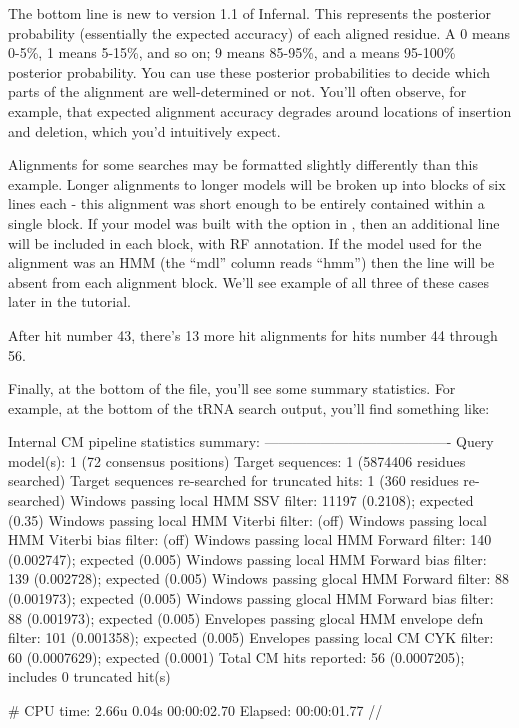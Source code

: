 The bottom line is new to version 1.1 of Infernal. This represents the
posterior probability (essentially the expected accuracy) of each
aligned residue. A 0 means 0-5\%, 1 means 5-15\%, and so on; 9 means
85-95\%, and a \otext{*} means 95-100\% posterior probability. You can
use these posterior probabilities to decide which parts of the
alignment are well-determined or not. You'll often observe, for
example, that expected alignment accuracy degrades around locations of
insertion and deletion, which you'd intuitively expect.

Alignments for some searches may be formatted slightly differently
than this example. Longer alignments to longer models will be broken
up into blocks of six lines each - this alignment was short enough to
be entirely contained within a single block.  If your model was built
with the  option in , then an additional
line will be included in each block, with RF annotation.  If the model
used for the alignment was an HMM (the ``mdl'' column reads ``hmm'')
then the  line will be absent from each alignment
block. We'll see example of all three of these cases later in the
tutorial.

After hit number 43, there's 13 more hit alignments for hits number 44
through 56. 

Finally, at the bottom of the file, you'll see some summary
statistics. For example, at the bottom of the tRNA search output,
you'll find something like:

\begin{sreoutput}
Internal CM pipeline statistics summary:
----------------------------------------
Query model(s):                                                  1  (72 consensus positions)
Target sequences:                                                1  (5874406 residues searched)
Target sequences re-searched for truncated hits:                 1  (360 residues re-searched)
Windows   passing  local HMM SSV           filter:           11197  (0.2108); expected (0.35)
Windows   passing  local HMM Viterbi       filter:                  (off)
Windows   passing  local HMM Viterbi  bias filter:                  (off)
Windows   passing  local HMM Forward       filter:             140  (0.002747); expected (0.005)
Windows   passing  local HMM Forward  bias filter:             139  (0.002728); expected (0.005)
Windows   passing glocal HMM Forward       filter:              88  (0.001973); expected (0.005)
Windows   passing glocal HMM Forward  bias filter:              88  (0.001973); expected (0.005)
Envelopes passing glocal HMM envelope defn filter:             101  (0.001358); expected (0.005)
Envelopes passing  local CM  CYK           filter:              60  (0.0007629); expected (0.0001)
Total CM hits reported:                                         56  (0.0007205); includes 0 truncated hit(s)

# CPU time: 2.66u 0.04s 00:00:02.70 Elapsed: 00:00:01.77
//
\end{sreoutput}

